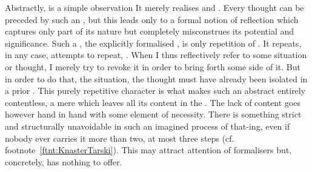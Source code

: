 \pa\label{pa:formalthat}
Abstractly,  is a simple observation   It
merely realises and .  Every thought can be preceded by such an
, but this leads only to a formal notion of reflection which
captures only part of its nature but completely misconstrues its potential and
significance. Such a , the explicitly formalised , is 
only repetition of . It repeats, in any case,
attempts to repeat, . When I thus reflectively refer to some
situation or thought, I merely try to revoke it in order to bring forth some
side of it. But in order to do that, the situation, the thought must have
already been isolated in a prior . This purely repetitive
character is what makes such an abstract  entirely contentless, a
mere  which leaves all its content in the .
%
The lack of content goes however hand in hand with some element of necessity. There
is something strict and structurally unavoidable in such an imagined
process of that-ing, even if nobody ever carries it more than two, at most three
steps (cf. footnote~\ref{ftnt:KnasterTarski}). This may attract attention of
formalisers but, concretely, has nothing to offer. 

